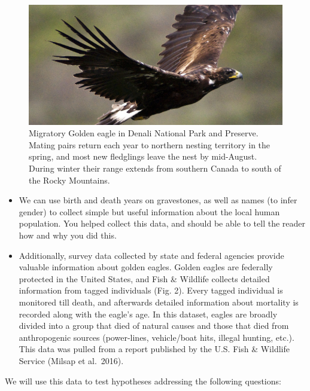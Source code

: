 \documentclass[11pt,]{article}
\begin{document}
\begin{figure}
\centering
\includegraphics{../_chapter_materials/golden_eagle.jpg}
\caption{Migratory Golden eagle in Denali National Park and Preserve.
Mating pairs return each year to northern nesting territory in the
spring, and most new fledglings leave the nest by mid-August. During
winter their range extends from southern Canada to south of the Rocky
Mountains.}
\end{figure}

\begin{itemize}
\item
  We can use birth and death years on gravestones, as well as names (to
  infer gender) to collect simple but useful information about the local
  human population. You helped collect this data, and should be able to
  tell the reader how and why you did this.
\item
  Additionally, survey data collected by state and federal agencies
  provide valuable information about golden eagles. Golden eagles are
  federally protected in the United States, and Fish \& Wildlife
  collects detailed information from tagged individuals (Fig. 2). Every
  tagged individual is monitored till death, and afterwards detailed
  information about mortality is recorded along with the eagle's age. In
  this dataset, eagles are broadly divided into a group that died of
  natural causes and those that died from anthropogenic sources
  (power-lines, vehicle/boat hits, illegal hunting, etc.). This data was
  pulled from a report published by the U.S. Fish \& Wildlife Service
  (Milsap et al.~2016).
\end{itemize}

\pagebreak

We will use this data to test hypotheses addressing the following
questions:
\end{document}
